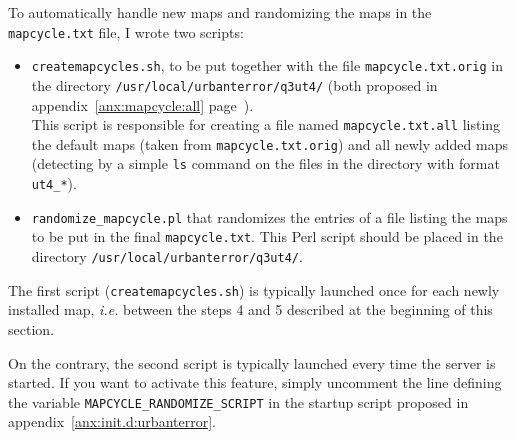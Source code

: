 \noindent To automatically handle new maps and randomizing the maps in the
\texttt{mapcycle.txt} file, I wrote two scripts: 
\begin{itemize}
\item \texttt{createmapcycles.sh}, to be put together with the file
  \texttt{mapcycle.txt.orig} in the directory
  \texttt{/usr/local/urbanterror/q3ut4/} (both proposed in
  appendix~\ref{anx:mapcycle:all} page~\pageref{anx:mapcycle:all}). \\
  This script is responsible for creating a file named \texttt{mapcycle.txt.all}
  listing the default maps (taken from \texttt{mapcycle.txt.orig}) and all newly
  added maps (detecting by a simple \texttt{ls} command on the files in the
  directory with format \texttt{ut4\_*}).
\item \texttt{randomize\_mapcycle.pl} that randomizes the entries of a file
  listing the maps to be put in the final \texttt{mapcycle.txt}. 
  This Perl script should be placed in the directory
  \texttt{/usr/local/urbanterror/q3ut4/}.  
\end{itemize}
 
The first script (\texttt{createmapcycles.sh}) is typically launched once for
each newly installed map, \emph{i.e.} between the steps 4 and 5 described at the
beginning of this section. 

On the contrary, the second script is typically launched every time the server
is started. If you want to activate this feature, simply uncomment the line
defining the variable \texttt{MAPCYCLE\_RANDOMIZE\_SCRIPT} in the startup script
proposed in appendix~\ref{anx:init.d:urbanterror}.


%

